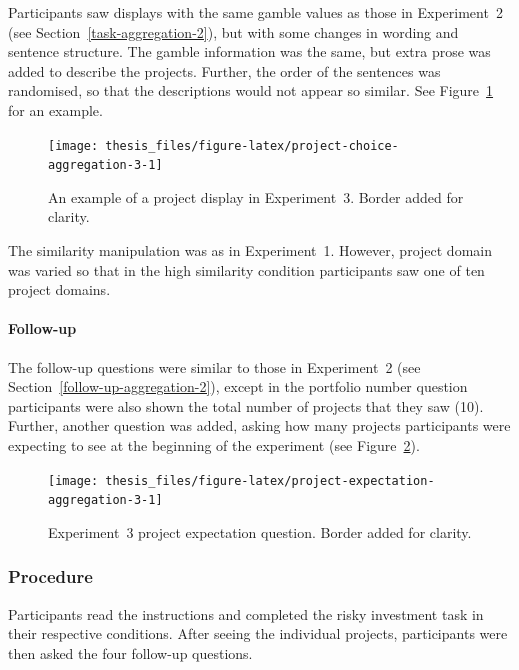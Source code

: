 \documentclass[a4paper, nobind, dvipsnames]{templates/ociamthesis}
\theoremstyle{definition}
\theoremstyle{definition}
\theoremstyle{definition}
\theoremstyle{definition}
\theoremstyle{remark}
\begin{document}
Participants saw displays with the same gamble values as those in Experiment~2
(see Section~\ref{task-aggregation-2}), but with some changes in wording and
sentence structure. The gamble information was the same, but extra prose was
added to describe the projects. Further, the order of the sentences was
randomised, so that the descriptions would not appear so similar. See
Figure~\ref{fig:project-choice-aggregation-3} for an example.



\begin{figure}
\texttt{[image: thesis\_files/figure-latex/project-choice-aggregation-3-1]} \caption{An example of a project display in Experiment~3. Border added for clarity.}\label{fig:project-choice-aggregation-3}
\end{figure}

The similarity manipulation was as in Experiment~1. However, project domain was
varied so that in the high similarity condition participants saw one of ten
project domains.

\hypertarget{follow-up-aggregation-3}{%
\paragraph{Follow-up}\label{follow-up-aggregation-3}}

The follow-up questions were similar to those in Experiment~2 (see
Section~\ref{follow-up-aggregation-2}), except in the portfolio number question
participants were also shown the total number of projects that they saw (10).
Further, another question was added, asking how many projects participants were
expecting to see at the beginning of the experiment (see
Figure~\ref{fig:project-expectation-aggregation-3}).



\begin{figure}
\texttt{[image: thesis\_files/figure-latex/project-expectation-aggregation-3-1]} \caption{Experiment~3 project expectation question. Border added for clarity.}\label{fig:project-expectation-aggregation-3}
\end{figure}

\subsubsection{Procedure}

Participants read the instructions and completed the risky investment task in
their respective conditions. After seeing the individual projects, participants
were then asked the four follow-up questions.
\end{document}
